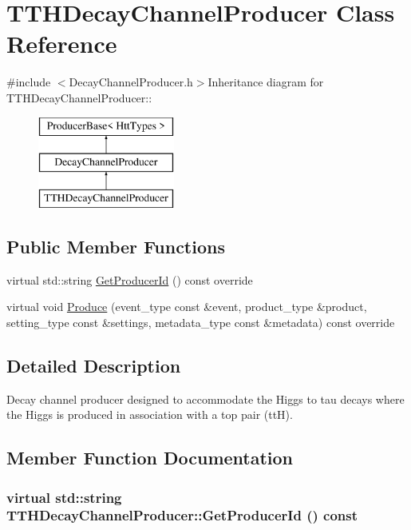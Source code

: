 \hypertarget{classTTHDecayChannelProducer}{
\section{TTHDecayChannelProducer Class Reference}
\label{classTTHDecayChannelProducer}
}


{\ttfamily \#include $<$DecayChannelProducer.h$>$}Inheritance diagram for TTHDecayChannelProducer::\begin{figure}[H]
\begin{center}
\leavevmode
\includegraphics[height=3cm]{classTTHDecayChannelProducer}
\end{center}
\end{figure}
\subsection*{Public Member Functions}
\begin{DoxyCompactItemize}
\item 
virtual std::string \hyperlink{classTTHDecayChannelProducer_aace688b4843340b15df45ba5b7481739}{GetProducerId} () const override
\item 
virtual void \hyperlink{classTTHDecayChannelProducer_a156d33176c768ffd652292bf365f73a0}{Produce} (event\_\-type const \&event, product\_\-type \&product, setting\_\-type const \&settings, metadata\_\-type const \&metadata) const override
\end{DoxyCompactItemize}


\subsection{Detailed Description}
Decay channel producer designed to accommodate the Higgs to tau decays where the Higgs is produced in association with a top pair (ttH). 

\subsection{Member Function Documentation}
\hypertarget{classTTHDecayChannelProducer_aace688b4843340b15df45ba5b7481739}{
\subsubsection[{GetProducerId}]{\setlength{\rightskip}{0pt plus 5cm}virtual std::string TTHDecayChannelProducer::GetProducerId () const}}
\label{classTTHDecayChannelProducer_aace688b4843340b15df45ba5b7481739}


